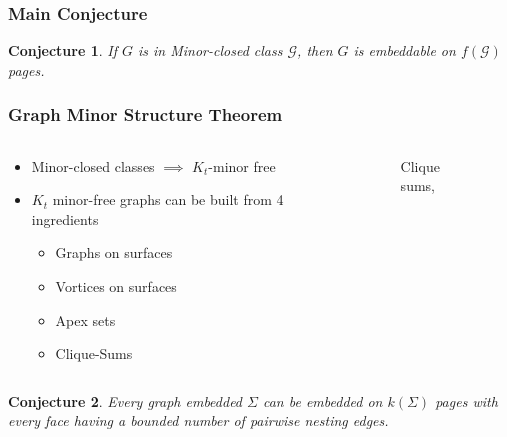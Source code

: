 \documentclass[english]{beamer}
\newtheorem{conjecture}{Conjecture}
\begin{document}
\begin{frame}
  \frametitle{Main Conjecture}
  \begin{conjecture}
    If $G$ is in Minor-closed class $\mathcal{G}$, then $G$ is embeddable on $f(\mathcal{G})$ pages.
  \end{conjecture}
\end{frame}

\begin{frame}
    \frametitle{Graph Minor Structure Theorem}
\begin{columns}
      \begin{column}{0.5\textwidth}
        \begin{itemize}
          \item Minor-closed classes $\implies$ $K_t$-minor free
          \item $K_t$ minor-free graphs can be built from 4 ingredients \cite{robertsonGraphMinorsXVII1999} \begin{itemize}
            \item Graphs on surfaces
            \item Vortices on surfaces
            \item Apex sets
            \item Clique-Sums
          \end{itemize}
        \end{itemize}
      \end{column}
      \begin{column}{0.5\textwidth}
        \begin{figure}
          \centering
          
          \caption{Clique sums, \cite{eppsteinCliquesum2023}}
        \end{figure}
      \end{column}
\end{columns}
\end{frame}

\begin{frame}
  \begin{conjecture}
    Every graph embedded $\Sigma$ can be embedded on $k(\Sigma)$ pages with every face having a bounded number of pairwise nesting edges.
\end{conjecture}
\end{frame}

\begin{frame}[shrink = 50]
  
  \printbibliography
\end{frame}
\end{document}
